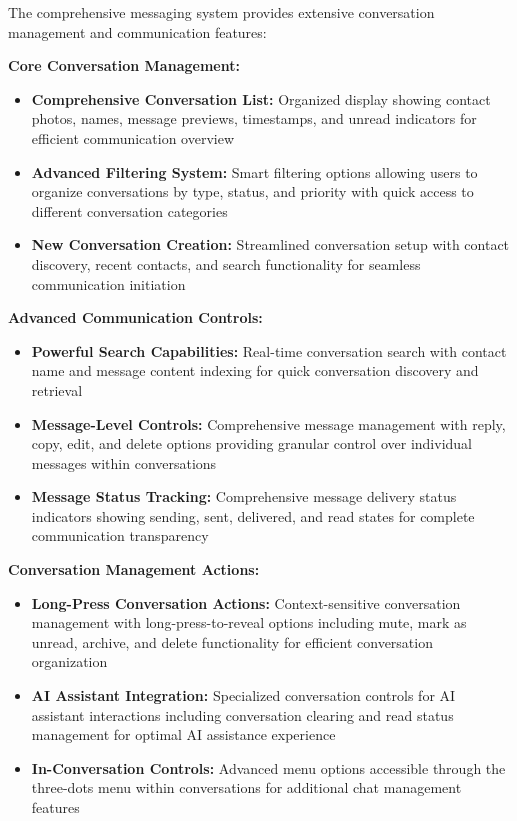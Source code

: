 The comprehensive messaging system provides extensive conversation management and communication features:

\textbf{Core Conversation Management:}
\begin{itemize}
    \item \textbf{Comprehensive Conversation List:} Organized display showing contact photos, names, message previews, timestamps, and unread indicators for efficient communication overview
    \item \textbf{Advanced Filtering System:} Smart filtering options allowing users to organize conversations by type, status, and priority with quick access to different conversation categories
    \item \textbf{New Conversation Creation:} Streamlined conversation setup with contact discovery, recent contacts, and search functionality for seamless communication initiation
\end{itemize}

\textbf{Advanced Communication Controls:}
\begin{itemize}
    \item \textbf{Powerful Search Capabilities:} Real-time conversation search with contact name and message content indexing for quick conversation discovery and retrieval
    \item \textbf{Message-Level Controls:} Comprehensive message management with reply, copy, edit, and delete options providing granular control over individual messages within conversations
    \item \textbf{Message Status Tracking:} Comprehensive message delivery status indicators showing sending, sent, delivered, and read states for complete communication transparency
\end{itemize}

\textbf{Conversation Management Actions:}
\begin{itemize}
    \item \textbf{Long-Press Conversation Actions:} Context-sensitive conversation management with long-press-to-reveal options including mute, mark as unread, archive, and delete functionality for efficient conversation organization
    \item \textbf{AI Assistant Integration:} Specialized conversation controls for AI assistant interactions including conversation clearing and read status management for optimal AI assistance experience
    \item \textbf{In-Conversation Controls:} Advanced menu options accessible through the three-dots menu within conversations for additional chat management features
\end{itemize}


